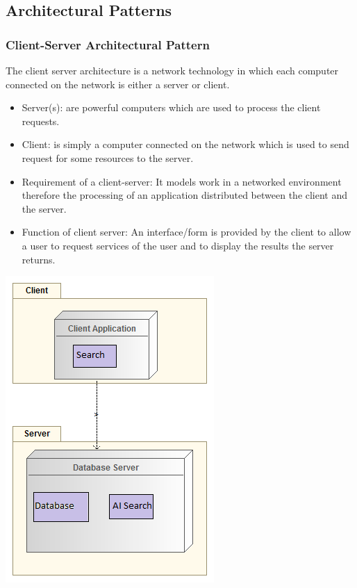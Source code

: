 \documentclass[a4paper,10pt]{article}
\begin{document}
	\subsection{Architectural Patterns}
	\subsubsection{Client-Server Architectural Pattern}
	The client server architecture is a network technology in which each computer connected on the network is either a server or 	client.
	\begin{itemize}
		\item Server(s): are powerful computers which are used to process the client requests.
		\item Client: is simply a computer connected on the network which is used to send request for some resources to the 	server.
	\end{itemize}
	\begin{itemize}
		\item Requirement of a client-server: It models work in a networked environment therefore the processing of an application distributed between the client and the server. 

		\item Function of client server: An interface/form is provided by the client to allow a user to request services of the 		user and to display the results the server returns.
	\end{itemize}
 	\includegraphics[scale=0.75]{Client_Server_Architecture.png}\\
\end{document}
